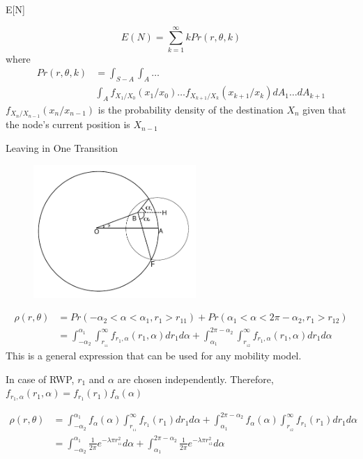\documentclass{beamer}
\begin{document}
\begin{frame}{E[N]}{}

\begin{equation*}
	E(N) = \sum_{k=1}^{\infty} k Pr(r,\theta,k)
\end{equation*}
where 
\begin{align*}
	Pr(r,\theta,k) &= \int_{S-A} \int_A \ldots \\ &\int_A f_{X_1/X_0}(x_1/x_0)\ldots f_{X_{k+1}/X_{k}}(x_{k+1}/x_{k}) dA_1 \ldots dA_{k+1}
\end{align*}  
$f_{X_n/X_{n-1}}(x_n/x_{n-1})$ is the probability density of the destination $X_n$ given that
the node's current position is $X_{n-1}$
\end{frame}



\begin{frame}{Leaving in One Transition}{}
\begin{figure}[h]
	\centering \vspace{-0.1in}
	\includegraphics[width=0.55\textwidth]{images/a1a2.pdf}
\end{figure}
\vspace{-1cm}
\begin{align*}
	\rho(r,\theta) &= Pr(-\alpha_2 < \alpha < \alpha_1,r_1 > r_{11}) + Pr(\alpha_1 < \alpha < 2\pi-\alpha_2, r_1 > r_{12}) \\
	&= \int_{-\alpha_2}^{\alpha_1} \int_{r_{\!_{11}}}^{\infty} f_{r_1,\alpha}(r_1,\alpha)dr_1 d\alpha +  \int^{2\pi-\alpha_2}_{\alpha_1} \int_{r_{\!_{12}}}^{\infty} f_{r_1,\alpha}(r_1,\alpha)dr_1 d\alpha 
\end{align*}
	This is a general expression that can be used for any mobility model. 
\end{frame}
\begin{frame}	
	
	In case of RWP,
	$r_1$ and $\alpha$ are chosen independently. Therefore, 
	$f_{r_1,\alpha}(r_1,\alpha) = f_{r_1}(r_1)f_{\alpha}(\alpha)$ 

\begin{align*}
	\rho(r,\theta)&= \int_{-\alpha_2}^{\alpha_1} f_{\alpha}(\alpha) \int_{r_{\!_{11}}}^{\infty} f_{r_1}(r_1)dr_1 d\alpha +  \int^{2\pi-\alpha_2}_{\alpha_1} f_{\alpha}(\alpha) \int_{r_{\!_{12}}}^{\infty} f_{r_1}(r_1)dr_1 d\alpha  \\
	&= \int_{-\alpha_2}^{\alpha_1} \frac{1}{2\pi} e^{-\lambda \pi r_{\!_{11}}^2} d\alpha +  \int^{2\pi-\alpha_2}_{\alpha_1} \frac{1}{2\pi} e^{-\lambda \pi r_{\!_{12}}^2} d\alpha
\end{align*}
\end{frame}
\end{document}
